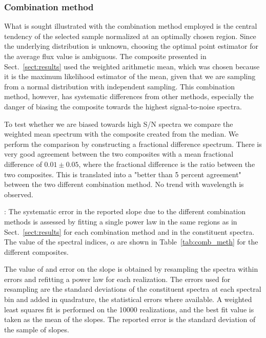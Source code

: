 \documentclass{aa}    %
\newcommand{\Tab}[1]{Table~\ref{tab:#1}}
\newcommand{\tab}[1]{\Tab{#1}}
\newcommand{\sectionname}{Sect.}
\newcommand{\Sect}[1]{\sectionname~\ref{sect:#1}}
\newcommand{\sect}[1]{\Sect{#1}}
\newcommand{\sectlabel}[1]{\label{sect:#1}}
\newcommand{\todo}[3]{{\color{#2}\emph{#1}: #3}}
\newcommand{\changed}[1]{\todo{}{green}{#1}}
\begin{document}
{%
\subsubsection{Combination method}  \sectlabel{Combination method}
What is sought illustrated with the combination method employed is the central tendency of the selected sample normalized at an optimally chosen region. Since the underlying distribution is unknown, choosing the optimal point estimator for the average flux value is ambiguous. The composite presented in \sect{results} used the weighted arithmetic mean, which was chosen because it is the maximum likelihood estimator of the mean, given that we are sampling from a normal distribution with independent sampling. This combination method, however, has systematic differences from other methods, especially the danger of biasing the composite towards the highest signal-to-noise spectra. 

To test whether we are biased towards high S/N spectra we compare the weighted mean spectrum with the composite created from the median. We perform the comparison by constructing a fractional difference spectrum. There is very good agreement between the two composites with a mean fractional difference of $0.01 \pm 0.05$, where the fractional difference is the ratio between the two composites. This is translated into a "better than 5 percent agreement" between the two different combination method. No trend with wavelength is observed.

\changed{
The systematic error in the reported slope due to the different combination methods is assessed by fitting a single power law in the same regions as in \sect{results} for each combination method and in the constituent spectra. The value of the spectral indices, $\alpha$ are shown in \tab{comb_meth} for the different composites.

 


The value of and error on the slope is obtained by resampling the spectra within errors and refitting a power law for each realization. The errors used for resampling are the standard deviations of the constituent spectra at each spectral bin and added in quadrature, the statistical errors where available. A weighted least squares fit is performed on the 10000 realizations, and the best fit value is taken as the mean of the slopes. The reported error is the standard deviation of the sample of slopes. 

}}
\end{document}
